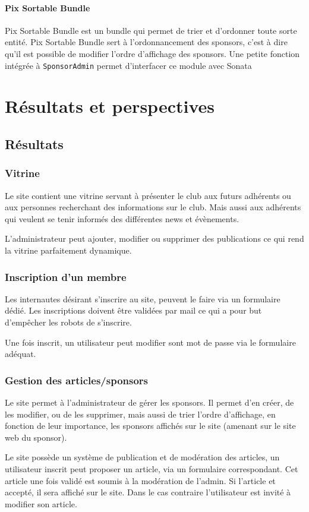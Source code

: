 \documentclass[a4paper,12pt, notitlepage]{report}
\begin{document}
\subsubsection{Pix Sortable Bundle}
Pix Sortable Bundle est un \gls{bundle} qui permet de trier et d'ordonner toute sorte entité.
Pix Sortable Bundle sert à l'ordonnancement des sponsors, c’est à dire qu’il est possible de modifier l’ordre d’affichage des sponsors. 
Une petite fonction intégrée à \verb?SponsorAdmin? permet d'interfacer ce module avec Sonata 


\chapter{Résultats et perspectives}
\section{Résultats}
\subsection{Vitrine}
Le site contient une vitrine servant à présenter le club aux futurs adhérents ou aux personnes recherchant des informations sur le club. Mais aussi aux adhérents qui veulent se tenir informés des différentes news et évènements.

L’administrateur peut ajouter, modifier ou supprimer des publications ce qui rend la vitrine parfaitement dynamique.
\subsection{Inscription d'un membre}
Les internautes désirant s’inscrire au site, peuvent le faire via un formulaire dédié. Les inscriptions doivent être validées par mail ce qui a pour but d'empêcher les robots de s'inscrire.

Une fois inscrit, un utilisateur peut modifier sont mot de passe via le formulaire adéquat.
\subsection{Gestion des articles/sponsors}
Le site permet à l’administrateur de gérer les sponsors. Il permet d’en créer, de les modifier, ou de les supprimer, mais aussi de trier l’ordre d’affichage, en fonction de leur importance, les sponsors affichés sur le site (amenant sur le site web du sponsor).

Le site  possède un système de publication et de modération des articles, un utilisateur inscrit peut proposer un article, via un formulaire correspondant.
Cet article une fois validé est soumis à la modération de l’admin. Si l’article et accepté, il sera affiché sur le site. Dans le cas contraire l’utilisateur est invité à modifier son article.
\end{document}
